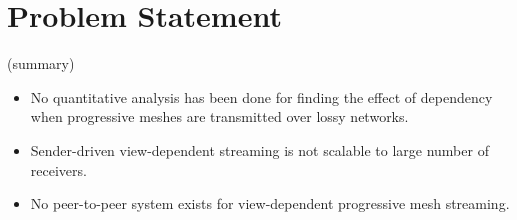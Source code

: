 \documentclass[11pt, a4paper]{report}
\begin{document}

    \section{Problem Statement}
    \label{s:intro:problem}
    (summary)
    \begin{itemize}
        \item No quantitative analysis has been done for 
            finding the effect of dependency 
            when progressive meshes are transmitted over lossy networks. 
        \item Sender-driven view-dependent streaming
            is not scalable to large number of receivers. 
        \item No peer-to-peer system 
            exists for view-dependent progressive mesh streaming. 
    \end{itemize}
    
\end{document}
